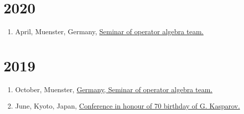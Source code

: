 \documentclass[a4paper, 13pt]{article}
\begin{document}
\section*{2020}
\begin{enumerate}
\item April, Muenster, Germany, \href{https://www.uni-muenster.de/OpAlg/en/opalgwinter.html}{Seminar of operator algebra team.}
\end{enumerate}
\section*{2019}
\begin{enumerate}
\item October, Muenster, \href{https://www.uni-muenster.de/OpAlg/en/opalgwinter.html}{Germany, Seminar of operator algebra team.}
\item June, Kyoto, Japan, \href{https://www.math.kyoto-u.ac.jp/~tkato/kasparov2019/}{Conference in honour of 70 birthday of G. Kasparov.}
\end{enumerate}
\end{document}
